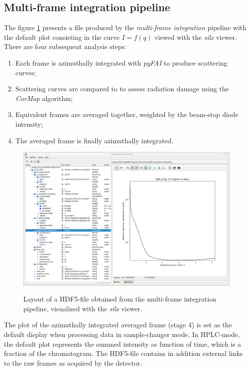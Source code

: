 \documentclass[preprint]{iucr}              %
\begin{document}
\subsection{Multi-frame integration pipeline}
\label{multiframe_pipeline}
The figure \ref{multiframe} presents a file produced by the \textit{multi-frame integration} pipeline with the default plot consisting in the curve $I = f(q)$ viewed with the \textit{silx} viewer. 
There are four subsequent analysis steps:
\begin{enumerate}
\item Each frame is azimuthally integrated with \textit{pyFAI} \cite{pyfai_2020} to produce scattering curves;
\item Scattering curves are compared to to assess radiation damage using the \textit{CorMap} \cite{CorMap} algorithm;
\item Equivalent frames are averaged together, weighted by the beam-stop diode intensity; 
\item The averaged frame is finally azimuthally integrated. 
\end{enumerate}

\begin{figure}
\caption{Layout of a HDF5-file obtained from the multi-frame integration pipeline, visualized with the \textit{silx} viewer.}
\includegraphics*[width=12cm]{multiframe.eps}
\label{multiframe}
\end{figure}


The plot of the azimuthally integrated averaged frame (stage 4) is set as the default display  when processing data in sample-changer mode.
In HPLC-mode, the default plot represents the summed intensity as function of time, which is a fraction of the chromatogram. 
The HDF5-file contains in addition external links to the raw frames as acquired by the detector.
\end{document}
